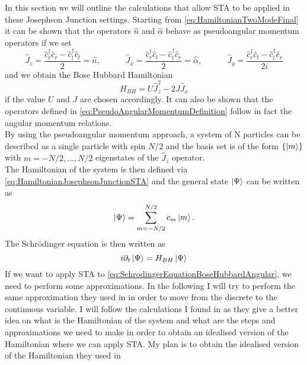In this section we will outline the calculations that allow STA to be applied in these Josephson Junction settings.
Starting from \cref{eq:HamiltonianTwoModeFinal} it can be shown that the operators $ \hat{n} $ and $ \hat{ \alpha } $ behave as pseudoangular momentum operators if we set
\begin{equation}
	\label{eq:PseudoAngularMomentumDefinition}
	\hat{J}_z = \frac{\hat{c}_{r}^{\dagger}\hat{c}_{r} - \hat{c}_{l}^{\dagger}\hat{c}_{l}}{2} = \hat{n},\hspace{3em} \hat{J}_x =\frac{\hat{c}_{r}^{\dagger}\hat{c}_{l} - \hat{c}_{l}^{\dagger}\hat{c}_{r}}{2} =  \hat{ \alpha }  ,\hspace{3em}  \hat{J}_y = \frac{\hat{c}_{r}^{\dagger}\hat{c}_{l} - \hat{c}_{l}^{\dagger}\hat{c}_{r}}{2i}
\end{equation}
and we obtain the Bose Hubbard Hamiltonian
\begin{equation}
	\label{eq:HamiltonianJosephsonJunctionSTA}
	H_{BH} =  U \hat{J}_z^2 - 2J\hat{J}_x
\end{equation}
if the value $ U $ and $ J $ are chosen accordingly.
It can also be shown that the operators defined in \cref{eq:PseudoAngularMomentumDefinition} follow in fact the angular momentum relations.\\
By using the pseudoangular momentum approach, a system of N particles can be described as a single particle with spin $ N/2 $ and the basis set is of the form $ \{\ket{m}\} $ with $ m = -N/2, ..., N/2 $ eigenstates of the $ \hat{J}_{z} $ operator.\\
The Hamiltonian of the system is then defined via \cref{eq:HamiltonianJosephsonJunctionSTA} and the general state $ \ket{\Psi} $ can be written as
\begin{equation}
	\label{eq:GeneralStateAngularMomentum}
	\ket{\Psi} = \sum_{m = -N/2}^{N/2} c_{m}\ket{m}.
\end{equation}
The Schr{\"o}dinger equation is then written as
\begin{equation}
	\label{eq:SchrodingerEquationBoseHubbardAngular}
	i\partial_t \ket{\Psi} = H_{BH}\ket{\Psi}
\end{equation}
If we want to apply STA to \cref{eq:SchrodingerEquationBoseHubbardAngular}, we need to perform some approximations.
In the following I will try to perform the same approximation they used in \cite{BoseEinsteinCJulia2010} in order to move from the discrete to the continuous variable.
I will follow the calculations I found in \cite{BoseEinsteinCJulia2010} as they give a better idea on what is the Hamiltonian of the system and what are the steps and approximations we need to make in order to obtain an idealised version of the Hamiltonian where we can apply STA.
My plan is to obtain the idealised version of the Hamiltonian they used in \cite{FastGenerationJulia2012}

